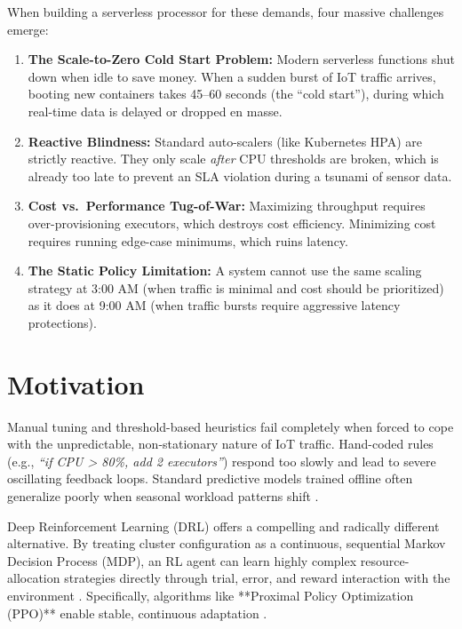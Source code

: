 When building a serverless processor for these demands, four massive challenges emerge:
\begin{enumerate}
  \item \textbf{The Scale-to-Zero Cold Start Problem:} Modern serverless functions shut down when idle to save money. When a sudden burst of IoT traffic arrives, booting new containers takes 45--60 seconds (the ``cold start''), during which real-time data is delayed or dropped en masse.
  \item \textbf{Reactive Blindness:} Standard auto-scalers (like Kubernetes HPA) are strictly reactive. They only scale \textit{after} CPU thresholds are broken, which is already too late to prevent an SLA violation during a tsunami of sensor data.
  \item \textbf{Cost vs.\ Performance Tug-of-War:} Maximizing throughput requires over-provisioning executors, which destroys cost efficiency. Minimizing cost requires running edge-case minimums, which ruins latency.
  \item \textbf{The Static Policy Limitation:} A system cannot use the same scaling strategy at 3:00 AM (when traffic is minimal and cost should be prioritized) as it does at 9:00 AM (when traffic bursts require aggressive latency protections).
\end{enumerate}

\section{Motivation}

Manual tuning and threshold-based heuristics fail completely when forced to cope with the unpredictable, non-stationary nature of IoT traffic. Hand-coded rules (e.g., \textit{``if CPU > 80\%, add 2 executors''}) respond too slowly and lead to severe oscillating feedback loops. Standard predictive models trained offline often generalize poorly when seasonal workload patterns shift \cite{nestorov2024dexter}. 

Deep Reinforcement Learning (DRL) offers a compelling and radically different alternative. By treating cluster configuration as a continuous, sequential Markov Decision Process (MDP), an RL agent can learn highly complex resource-allocation strategies directly through trial, error, and reward interaction with the environment \cite{zhou2024deep}. Specifically, algorithms like **Proximal Policy Optimization (PPO)** enable stable, continuous adaptation \cite{schulman2017ppo}. 

